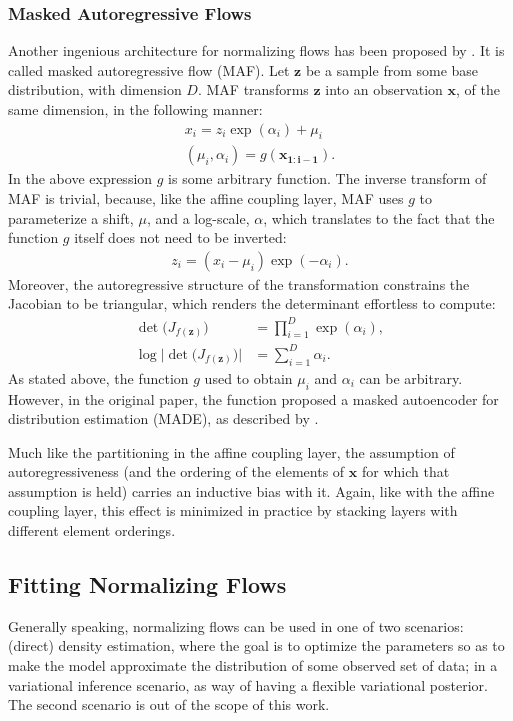 \subsubsection{Masked Autoregressive Flows}
Another ingenious architecture for normalizing flows has been proposed by \textcite{maf}.
It is called masked autoregressive flow (MAF). Let $\bm{z}$ be a sample from
some base distribution, with dimension $D$. MAF transforms $\bm{z}$ into an
observation $\bm{x}$, of the same dimension, in the following manner:
\begin{align}
x_i = z_i \exp(\alpha_i) + \mu_i \\
(\mu_i, \alpha_i) = g(\bm{x_{1:i-1}}).
\end{align}
In the above expression $g$ is some arbitrary function. The inverse transform of
MAF is trivial, because, like the affine coupling layer, MAF uses $g$ to parameterize
a shift, $\mu$, and a log-scale, $\alpha$, which translates to the fact that the
function $g$ itself does not need to be inverted:
\begin{align}
z_i = (x_i - \mu_i)\exp(-\alpha_i).
\end{align}
Moreover, the autoregressive structure of the transformation constrains the
Jacobian to be triangular, which renders the determinant effortless to compute: 
\begin{align}
\det\big( J_{f(\bm{z})} \big) &= \prod_{i=1}^{D} \exp(\alpha_i), \\
\log \Big| \det \big( J_{f(\bm{z})} \big) \Big| &= \sum_{i=1}^{D} \alpha_i.
\end{align}
As stated above, the function $g$ used to obtain $\mu_i$ and $\alpha_i$ can be
arbitrary. However, in the original paper, the function proposed a masked
autoencoder for distribution estimation (MADE), as described by \textcite{MADE}.

Much like the partitioning in the affine coupling layer, the assumption of
autoregressiveness (and the ordering of the elements of $\bm{x}$
for which that assumption is held) carries an inductive bias with it. Again,
like with the affine coupling layer, this effect is minimized in practice by
stacking layers with different element orderings.

\subsection{Fitting Normalizing Flows}

Generally speaking, normalizing flows can be used in one of two scenarios:
(direct) density estimation, where the goal is to optimize the parameters
so as to make the model approximate the distribution of some observed set of data;
in a variational inference scenario, as way of having a flexible variational
posterior. The second scenario is out of the scope of this work.

